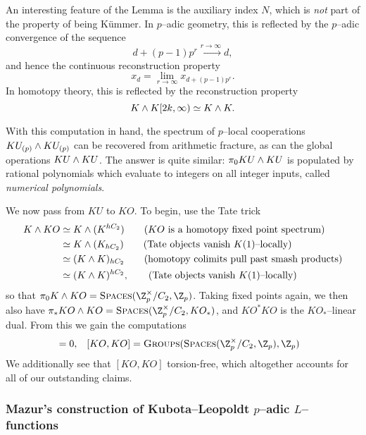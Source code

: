 \begin{remark}
An interesting feature of the Lemma is the auxiliary index $N$, which is \emph{not} part of the property of being K\"ummer.  In $p$--adic geometry, this is reflected by the $p$--adic convergence of the sequence \[d + (p-1)p^r \xrightarrow{r \to \infty} d,\] and hence the continuous reconstruction property \[x_d = \lim_{r \to \infty} x_{d + (p-1)p^r}.\]  In homotopy theory, this is reflected by the reconstruction property \[K \wedge K[2k, \infty) \simeq K \wedge K.\]
\end{remark}

\begin{remark}
With this computation in hand, the spectrum of $p$--local cooperations $KU_{(p)} \wedge KU_{(p)}$ can be recovered from arithmetic fracture, as can the global operations $KU \wedge KU$.  The answer is quite similar: $\pi_0 KU \wedge KU$ is populated by rational polynomials which evaluate to integers on all integer inputs, called \textit{numerical polynomials}.
\end{remark}

We now pass from $KU$ to $KO$.  To begin, use the Tate trick
\begin{align*}
K \wedge KO & \simeq K \wedge (K^{hC_2}) \tag{$KO$ is a homotopy fixed point spectrum} \\
& \simeq K \wedge (K_{hC_2}) \tag{Tate objects vanish $K(1)$--locally} \\
& \simeq (K \wedge K)_{hC_2} \tag{homotopy colimits pull past smash products} \\
& \simeq (K \wedge K)^{hC_2}, \tag{Tate objects vanish $K(1)$--locally}
\end{align*}
so that $\pi_0 K \sm KO = \CatOf{Spaces}(\Z_p^\times / C_2, \Z_p)$.  Taking fixed points again, we then also have $\pi_* KO \sm KO = \CatOf{Spaces}(\Z_p^\times / C_2, KO_*)$, and $KO^* KO$ is the $KO_*$--linear dual.  From this we gain the computations
\begin{align*}
[\Susp^{-1} KO, KO] & = 0, &
[KO, KO] & = \CatOf{Groups}(\CatOf{Spaces}(\Z_p^\times / C_2, \Z_p), \Z_p)
\end{align*}
We additionally see that $[KO, KO]$ torsion-free, which altogether accounts for all of our outstanding claims.


\subsubsection{Mazur's construction of Kubota--Leopoldt $p$--adic $L$--functions}

